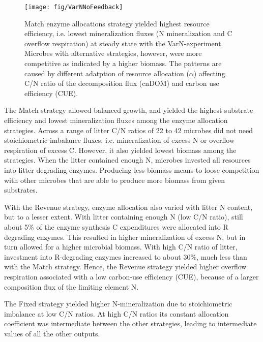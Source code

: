 \begin{figure}[t] \vspace*{2mm}
\begin{center}
\texttt{[image: fig/VarNNoFeedback]}
\end{center}
\caption{
Match enzyme allocations strategy yielded highest resource efficiency, i.e.
lowest mineralization fluxes (N mineralization and C overflow respiration) at
steady state with the VarN-experiment.
Microbes with alternative strategies, however, were more competitive as
indicated by a higher biomass. The patterns are caused by different adatption of
resource allocation ($\alpha$) affecting C/N ratio of the decomposition flux
(cnDOM) and carbon use efficiency (CUE).
\label{fig:VarNNoFeedback}} 
\end{figure}

The Match strategy allowed balanced growth, and yielded the highest substrate
efficiency and lowest mineralization fluxes among the enzyme allocation
strategies. Across a range of litter C/N ratios of 22 to 42 microbes did not
need stoichiometric imbalance fluxes, i.e. mineralization of excess N or
overflow respiration of excess C. However, it also yielded lowest biomass among
the strategies. When the litter contained enough N, microbes invested all
resources into litter degrading enzymes. Producing less biomass means to loose
competition with other microbes that are able to produce more biomass from given
substrates.

With the Revenue strategy, enzyme allocation also varied with litter N content,
but to a lesser extent.
With litter containing enough N (low C/N ratio), still about 5\% of the enzyme
synthesis C expenditures were allocated into R degrading enzymes. This resulted
in higher mineralization of excess N, but in turn allowed for a higher microbial
biomass.
With high C/N ratio of litter, investment into R-degrading enzymes increased to
about 30\%, much less than with the Match strategy. Hence, the Revenue strategy
yielded higher overflow respiration associated with a low carbon-use
efficiency (CUE), because of a larger composition flux of the limiting element
N.

The Fixed strategy yielded higher N-mineralization due to stoichiometric
imbalance at low C/N ratios.
At high C/N ratios its constant allocation coefficient was intermediate between
the other strategies, leading to intermediate values of all the other outputs.



